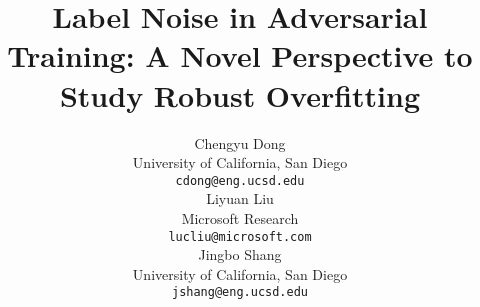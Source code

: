 \documentclass{article}
\title{Label Noise in Adversarial Training: A Novel Perspective to Study Robust Overfitting}
\author{%
Chengyu Dong \\
University of California, San Diego\\
\texttt{cdong@eng.ucsd.edu}\\
\And
Liyuan Liu\\
Microsoft Research\\
\texttt{lucliu@microsoft.com}\\
\And
Jingbo Shang\\
University of California, San Diego\\
\texttt{jshang@eng.ucsd.edu}\\
}
\begin{document}
\maketitle


\begin{abstract}

\end{abstract}

















\newpage
\appendix\onecolumn







\end{document}
